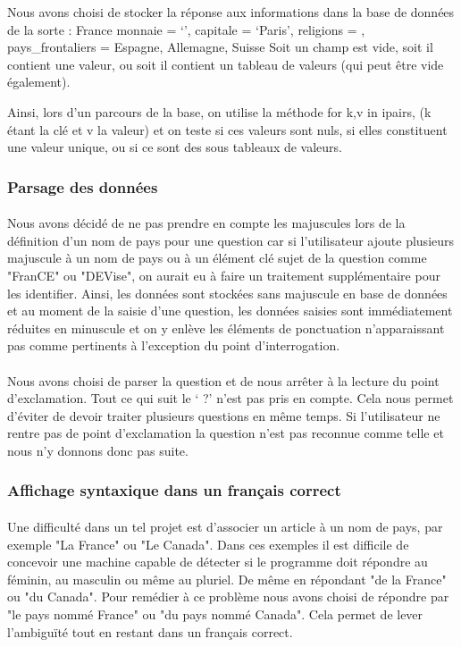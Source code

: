 \documentclass[11pt,a4paper]{article}
\begin{document}
Nous avons choisi de stocker la réponse aux informations dans la base de données de la sorte :
France {
	monnaie = ‘’,
	capitale = ‘Paris’,
	religions = {},
	pays\_frontaliers = { Espagne, Allemagne, Suisse }
}
Soit un champ est vide, soit il contient une valeur, ou soit il contient un tableau de valeurs (qui peut être vide également). 

Ainsi, lors d'un parcours de la base, on utilise la méthode for k,v in ipairs, (k étant la clé et v la valeur) et on teste si ces valeurs sont nuls, si elles constituent une valeur unique, ou si ce sont des sous tableaux de valeurs. 

\subsubsection{Parsage des données}

\paragraph{}Nous avons décidé de ne pas prendre en compte les majuscules lors de la définition d'un nom de pays pour une question car si l'utilisateur ajoute plusieurs majuscule à un nom de pays ou à un élément clé sujet de la question comme "FranCE" ou "DEVise", on aurait eu à faire un traitement supplémentaire pour les identifier. Ainsi, les données sont stockées sans majuscule en base de données et au moment de la saisie d'une question, les données saisies sont immédiatement réduites en minuscule et on y enlève les éléments de ponctuation n'apparaissant pas comme pertinents à l'exception du point d'interrogation. 
\paragraph{}Nous avons choisi de parser la question et de nous arrêter à la lecture du point d’exclamation. Tout ce qui suit le ‘ ?’ n’est pas pris en compte. Cela nous permet d’éviter de devoir traiter plusieurs questions en même temps. Si l’utilisateur ne rentre pas de point d’exclamation la question n’est pas reconnue comme telle et nous n’y donnons donc pas suite.

\subsubsection{Affichage syntaxique dans un français correct}

\paragraph{}Une difficulté dans un tel projet est d'associer un article à un nom de pays, par exemple "La France" ou "Le Canada". Dans ces exemples il est difficile de concevoir une machine capable de détecter si le programme doit répondre au féminin, au masculin ou même au pluriel. De même en répondant "de la France" ou "du Canada". Pour remédier à ce problème nous avons choisi de répondre par "le pays nommé France" ou "du pays nommé Canada". Cela permet de lever l'ambiguïté tout en restant dans un français correct. 
\end{document}
